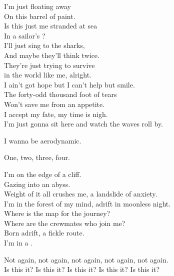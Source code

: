 
I'm just floating away \\
On this barrel of paint. \\
Is this just me stranded at sea \\
In a sailor's ? \\
I'll just sing to the sharks, \\
And maybe they'll think twice. \\

They're just trying to survive \\
in the world like me, alright. \\
I ain't got hope but I can't help but smile. \\
The forty-odd thousand foot of tears \\
Won't save me from an appetite. \\
I accept my fate, my time is nigh. \\
I'm just gonna sit here and watch the waves roll by. \\


I wanna be aerodynamic. \\





One, two, three, four. \\


I'm on the edge of a cliff. \\
Gazing into an abyss. \\
Weight of it all crushes me, a landslide of anxiety. \\
I'm in the forest of my mind, adrift in moonless night. \\
Where is the map for the journey? \\
Where are the crewmates who join me? \\
Born adrift, a fickle route. \\
I'm in a . \\


Not again, not again, not again, not again, not again. \\
Is this it? Is this it? Is this it? Is this it? Is this it? \\

